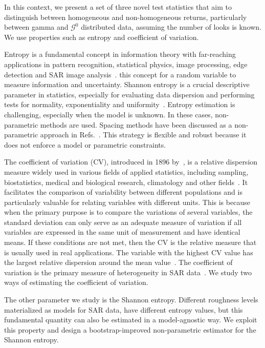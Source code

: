 In this context, we present a set of three novel test statistics that
aim to distinguish between homogeneous and non-homogeneous returns,
particularly between gamma and \(\mathcal{G}^0\) distributed data,
assuming the number of looks is known.
 We use properties such as entropy and coefficient of variation.

Entropy is a fundamental concept in information theory with far-reaching
applications in pattern recognition, statistical physics, image
processing, edge detection and SAR image
analysis~\citep{Presse2013,MohammadDjafari2015,Avval2021, Nascimento2014,Nascimento2019}.
\citet{Shannon1948} this concept for a random variable to measure information and uncertainty. 
Shannon entropy is a crucial descriptive parameter in statistics, especially for evaluating data
dispersion and performing tests for normality, exponentiality and
uniformity~\citep{Wieczorkowski1999,Zamanzade2012}. 
Entropy estimation is challenging, especially when the model is unknown. In these cases,
non-parametric methods are used. Spacing methods have been discussed as
a non-parametric approach in Refs.~\citep{AlizadehNoughabi2010,Subhash2021}. This strategy is flexible
and robust because it does not enforce a model or parametric
constraints.

The coefficient of variation (CV), introduced in 1896 by~\citet{Pearson1896}, is a relative dispersion measure widely used
in various fields of applied statistics, including sampling,
biostatistics, medical and biological research, climatology and other
fields~\citep{hendricks1936sampling,Tian2005,SubrahmanyaNairy2003,Chankham2024}.
It facilitates the comparison of variability between different
populations and is particularly valuable for relating variables with
different units. This is because when the primary purpose is to compare
the variations of several variables, the standard deviation can only
serve as an adequate measure of variation if all variables are expressed
in the same unit of measurement and have identical means. If these
conditions are not met, then the CV is the relative measure that is
usually used in real applications. The variable with the highest CV
value has the largest relative dispersion around the mean
value~\citep{Banik2011}. The coefficient of variation is the primary
measure of heterogeneity in SAR data~\citep{Ulaby1986,Touzi1988}. We
study two ways of estimating the coefficient of variation.

The other parameter we study is the Shannon entropy. Different roughness
levels materialized as models for SAR data, have different entropy
values, but this fundamental quantity can also be estimated in a
model-agnostic way. We exploit this property and design a
bootstrap-improved non-parametric estimator for the Shannon entropy.

